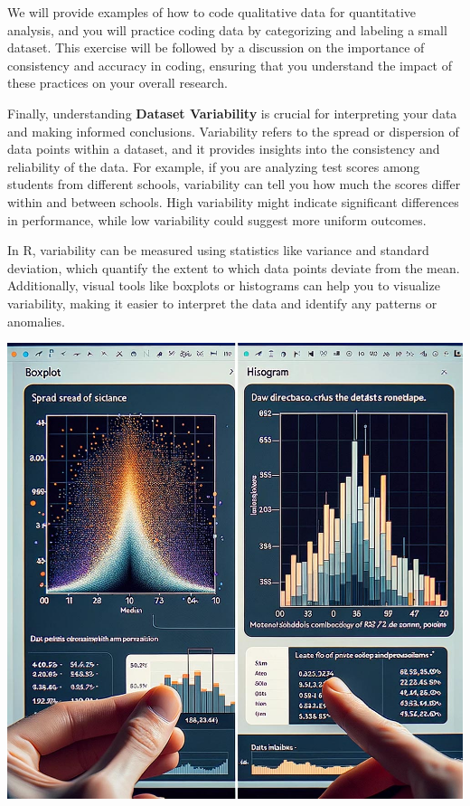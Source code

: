 \documentclass[
]{book}
\begin{document}
We will provide examples of how to code qualitative data for quantitative analysis, and you will practice coding data by categorizing and labeling a small dataset. This exercise will be followed by a discussion on the importance of consistency and accuracy in coding, ensuring that you understand the impact of these practices on your overall research.

Finally, understanding \textbf{Dataset Variability} is crucial for interpreting your data and making informed conclusions. Variability refers to the spread or dispersion of data points within a dataset, and it provides insights into the consistency and reliability of the data. For example, if you are analyzing test scores among students from different schools, variability can tell you how much the scores differ within and between schools. High variability might indicate significant differences in performance, while low variability could suggest more uniform outcomes.

In R, variability can be measured using statistics like variance and standard deviation, which quantify the extent to which data points deviate from the mean. Additionally, visual tools like boxplots or histograms can help you to visualize variability, making it easier to interpret the data and identify any patterns or anomalies.

\includegraphics[width=1\textwidth,height=\textheight]{images/fig073.jpg}
\end{document}
